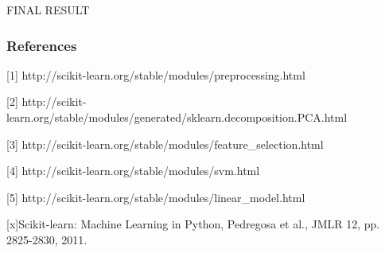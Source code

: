 \documentclass{article} %
\begin{document}
FINAL RESULT

\subsubsection*{References}

\small{
[1] http://scikit-learn.org/stable/modules/preprocessing.html

[2] http://scikit-learn.org/stable/modules/generated/sklearn.decomposition.PCA.html

[3] http://scikit-learn.org/stable/modules/feature\_selection.html

[4] http://scikit-learn.org/stable/modules/svm.html

[5] http://scikit-learn.org/stable/modules/linear\_model.html

[x]Scikit-learn: Machine Learning in Python, Pedregosa et al., JMLR 12, pp. 2825-2830, 2011.

}
\end{document}
